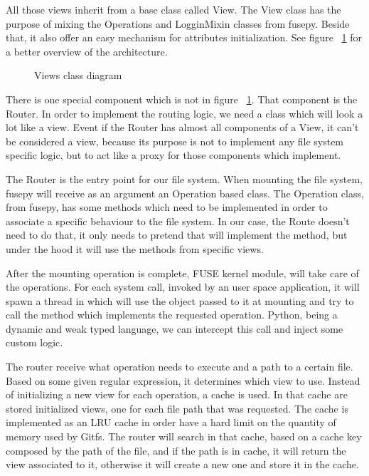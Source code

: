 All those views inherit from a base class called View. The View class has the purpose of mixing the Operations and LogginMixin classes from fusepy. Beside that, it also offer an easy mechanism for attributes initialization. See figure ~\ref{fig:views_diagram} for a better overview of the architecture.

\begin{figure}[h]
  \begin{center}
    \def\svgwidth{\columnwidth}
    
  \end{center}
  \caption{Views class diagram}
  \label{fig:views_diagram}
\end{figure}

There is one special component which is not in figure ~\ref{fig:views_diagram}. That component is the Router. In order to implement the routing logic, we need a class which will look a lot like a view. Event if the Router has almost all components of a View, it can't be considered a view, because its purpose is not to implement any file system specific logic, but to act like a proxy for those components which implement.

The Router is the entry point for our file system. When mounting the file system, fusepy will receive as an argument an Operation based class. The Operation class, from fusepy, has some methods which need to be implemented in order to associate a specific behaviour to the file system. In our case, the Route doesn't need to do that, it only needs to pretend that will implement the method, but under the hood it will use the methods from specific views.

After the mounting operation is complete, FUSE kernel module, will take care of the operations. For each system call, invoked by an user space application, it will spawn a thread in which will use the object passed to it at mounting and try to call the method which implements the requested operation. Python, being a dynamic and weak typed language, we can intercept this call and inject some custom logic. 

The router receive what operation needs to execute and a path to a certain file. Based on some given regular expression, it determines which view to use. Instead of initializing a new view for each operation, a cache is used. In that cache are stored initialized views, one for each file path that was requested. The cache is implemented as an LRU cache \cite{lru} in order have a hard limit on the quantity of memory used by Gitfs. The router will search in that cache, based on a cache key composed by the path of the file, and if the path is in cache, it will return the view associated to it, otherwise it will create a new one and store it in the cache.

